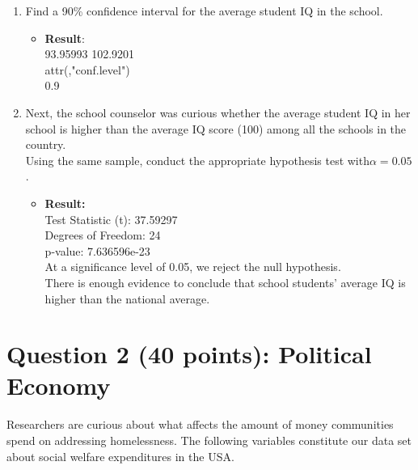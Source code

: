 \documentclass[12pt,letterpaper]{article}
\begin{document}
\begin{enumerate}
	\item Find a 90\% confidence interval for the average student IQ in the school.\\
	  
	  \begin{itemize}
		\item \textbf{Result}:\\
		 93.95993  102.9201\\
		 attr(,"conf.level")\\
		 0.9\\
		
       \end{itemize}
	\item Next, the school counselor was curious  whether  the average student IQ in her school is higher than the average IQ score (100) among all the schools in the country.\\ 
	\noindent Using the same sample, conduct the appropriate hypothesis test with$\alpha=0.05$.
		 
		\begin{itemize}
	      \item \textbf{Result:}\\
	      Test Statistic (t): 37.59297 \\
	      Degrees of Freedom: 24 \\
	      p-value: 7.636596e-23 \\
		  At a significance level of 0.05, we reject the null hypothesis.\\
		  There is enough evidence to conclude that school students' average IQ is higher than the national average.
	\end{itemize}
\end{enumerate}

\newpage

	\section*{Question 2 (40 points): Political Economy}

\noindent Researchers are curious about what affects the amount of money communities spend on addressing homelessness. The following variables constitute our data set about social welfare expenditures in the USA. \\
\vspace{.5cm}
\end{document}
